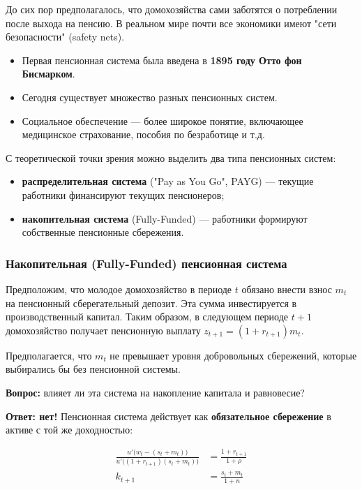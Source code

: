 \documentclass[10pt,a4paper]{article}
\begin{document}
До сих пор предполагалось, что домохозяйства сами заботятся о потреблении после выхода на пенсию. В реальном мире почти все экономики имеют "сети безопасности" (safety nets).
\begin{itemize}[leftmargin=1.3em]
\item Первая пенсионная система была введена в \textbf{1895 году Отто фон Бисмарком}.
\item Сегодня существует множество разных пенсионных систем.
\item Социальное обеспечение — более широкое понятие, включающее медицинское страхование, пособия по безработице и т.д.
\end{itemize}

С теоретической точки зрения можно выделить два типа пенсионных систем:
\begin{itemize}[leftmargin=1.3em]
\item \textbf{распределительная система} ("Pay as You Go", PAYG) — текущие работники финансируют текущих пенсионеров;
\item \textbf{накопительная система} (Fully-Funded) — работники формируют собственные пенсионные сбережения.
\end{itemize}

\subsubsection{Накопительная (Fully-Funded) пенсионная система}

Предположим, что молодое домохозяйство в периоде $t$ обязано внести взнос $m_t$ на пенсионный сберегательный депозит. Эта сумма инвестируется в производственный капитал. Таким образом, в следующем периоде $t+1$ домохозяйство получает пенсионную выплату $z_{t+1} = (1+r_{t+1})m_t$.

Предполагается, что $m_t$ не превышает уровня добровольных сбережений, которые выбирались бы без пенсионной системы.

\textbf{Вопрос:} влияет ли эта система на накопление капитала и равновесие?

\textbf{Ответ: нет!} Пенсионная система действует как \textbf{обязательное сбережение} в активе с той же доходностью:
\begin{formulabox}
\begin{align}
\frac{u'\big(w_t - (s_t+m_t)\big)}{u'\big((1+r_{t+1})(s_t+m_t)\big)} &= \frac{1+r_{t+1}}{1+\rho} \tag{4.34}\\
k_{t+1} &= \frac{s_t+m_t}{1+n} \tag{4.35}
\end{align}
\end{formulabox}
\end{document}
